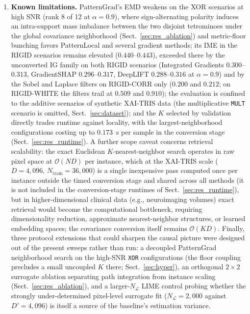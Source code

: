 \documentclass[pdflatex,sn-mathphys-num]{sn-jnl}
\theoremstyle{thmstyleone}
\theoremstyle{thmstyletwo}%
\theoremstyle{thmstylethree}%
\begin{document}
\begin{enumerate}
    \item \textbf{Known limitations.} PatternGrad's EMD weakens on the XOR scenarios at high SNR (rank 8 of 12 at $\alpha = 0.9$), where sign-alternating polarity induces an intra-support mass imbalance between the two disjoint tetrominoes under the global covariance neighborhood (Sect.~\ref{sec:res_ablation}) and metric-floor bunching favors PatternLocal and several gradient methods; its IME in the RIGID scenarios remains elevated ($0.440$--$0.443$), exceeded there by the unconverted IG family on both RIGID scenarios (Integrated Gradients $0.300$--$0.313$, GradientSHAP $0.296$--$0.317$, DeepLIFT $0.288$--$0.316$ at $\alpha = 0.9$) and by the Sobel and Laplace filters on RIGID-CORR only ($0.200$ and $0.212$; on RIGID-WHITE the filters trail at $0.509$ and $0.910$); the evaluation is confined to the additive scenarios of synthetic XAI-TRIS data (the multiplicative \texttt{MULT} scenario is omitted, Sect.~\ref{sec:dataset}); and the $K$ selected by validation directly trades runtime against locality, with the largest-neighborhood configurations costing up to $0.173$~s per sample in the conversion stage (Sect.~\ref{sec:res_runtime}). A further scope caveat concerns retrieval scalability: the exact Euclidean $K$-nearest-neighbor search operates in raw pixel space at $\mathcal{O}(ND)$ per instance, which at the XAI-TRIS scale ($D = 4{,}096$, $N_{\text{train}} = 36{,}000$) is a single inexpensive pass computed once per instance outside the timed conversion stage and shared across all methods (it is not included in the conversion-stage runtimes of Sect.~\ref{sec:res_runtime}), but in higher-dimensional clinical data (e.g., neuroimaging volumes) exact retrieval would become the computational bottleneck, requiring dimensionality reduction, approximate nearest-neighbor structures, or learned embedding spaces; the covariance conversion itself remains $\mathcal{O}(KD)$. Finally, three protocol extensions that could sharpen the causal picture were designed out of the present sweeps rather than run: a decoupled PatternGrad neighborhood search on the high-SNR \texttt{XOR} configurations (the floor coupling precludes a small uncoupled $K$ there; Sect.~\ref{sec:hyper}), an orthogonal $2 \times 2$ surrogate ablation separating path integration from instance scaling (Sect.~\ref{sec:res_ablation}), and a larger-$N_{\mathcal{L}}$ LIME control probing whether the strongly under-determined pixel-level surrogate fit ($N_{\mathcal{L}} = 2{,}000$ against $D' = 4{,}096$) is itself a source of the baseline's estimation variance.
\end{enumerate}
\end{document}
